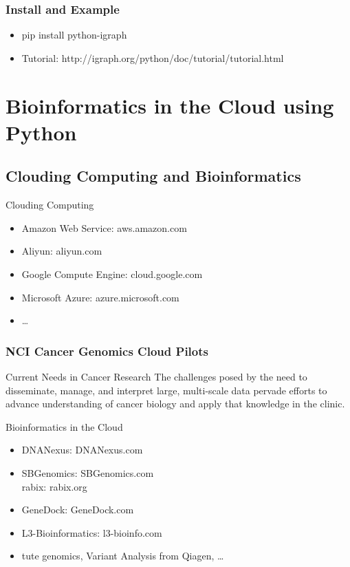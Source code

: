 \documentclass[UTF8]{beamer}
\begin{document}
\begin{frame}
  \frametitle{Install and Example}
  \begin{itemize}
    \item pip install python-igraph
    \item Tutorial: http://igraph.org/python/doc/tutorial/tutorial.html
  \end{itemize}
\end{frame}

\section{Bioinformatics in the Cloud using Python}

\subsection{Clouding Computing and Bioinformatics}

\begin{frame}{Clouding Computing}
  \begin{itemize}
    \item Amazon Web Service: aws.amazon.com
    \item Aliyun: aliyun.com
    \item Google Compute Engine: cloud.google.com
    \item Microsoft Azure: azure.microsoft.com
    \item \ldots
  \end{itemize}
\end{frame}

\begin{frame}
  \frametitle{NCI Cancer Genomics Cloud Pilots}
  \begin{block}{Current Needs in Cancer Research}
    The challenges posed by the need to disseminate, manage, and interpret
    large, multi-scale data pervade efforts to advance understanding of cancer
    biology and apply that knowledge in the clinic.
  \end{block}
\end{frame}

\begin{frame}{Bioinformatics in the Cloud}
  \begin{itemize}
    \item DNANexus: DNANexus.com
    \item SBGenomics: SBGenomics.com\\
      rabix: rabix.org
    \item GeneDock: GeneDock.com
    \item L3-Bioinformatics: l3-bioinfo.com
    \item tute genomics, Variant Analysis from Qiagen, \ldots
  \end{itemize}
\end{frame}
\end{document}
